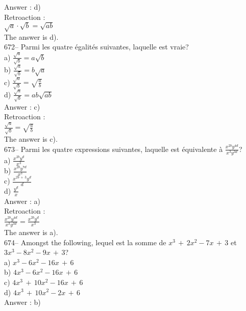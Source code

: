 ﻿\documentclass[letterpaper, 12pt]{article}
\begin{document}
Answer : d)\\

Retroaction : \\
$\sqrt{a}\cdot\sqrt{b}=\sqrt{ab}$\\
The answer is d).\\

672-- Parmi les quatre \'egalit\'es suivantes, laquelle est vraie?\\
a) $\frac{\sqrt{a}}{\sqrt{b}}=a\sqrt{b}$\\[2mm]
b) $\frac{\sqrt{a}}{\sqrt{b}}=b\sqrt{a}$\\[2mm]
c) $\frac{\sqrt{a}}{\sqrt{b}}=\sqrt{\frac{a}{b}}$\\[2mm]
d) $\frac{\sqrt{a}}{\sqrt{b}}=ab\sqrt{ab}$\\

Answer : c)\\

Retroaction : \\[2mm]
$\frac{\sqrt{a}}{\sqrt{b}}=\sqrt{\frac{a}{b}}$\\[2mm]
The answer is c).\\

673-- Parmi les quatre expressions suivantes, laquelle est \'equivalente \`a
$\frac{x^{2b}y^{4d}}{x^{3}y^{3d}}$?\\
a) $\frac{x^{2b}y^{d}}{x^{3}}$\\[2mm]
b) $\frac{x^{2b}y^{7d}}{x^{3}}$\\[2mm]
c) $\frac{x^{2b\,+\,3}y^{d}}{d}$\\[2mm]
d) $\frac{y^{d}}{x}$\\

Answer : a)\\

Retroaction : \\[2mm]
$\frac{x^{2b}y^{4d}}{x^{3}y^{3d}}=\frac{x^{2b}y^{d}}{x^{3}}$\\[2mm]
The answer is a).\\


674-- Amongst the following, lequel est la somme de
$x^{3}\,+\,2x^{2}-7x\,+\,3$ et $3x^{3}-8x^{2}-9x\,+\,3$?\\
a) $x^{3}-6x^{2}-16x\,+\,6$\\
b) $4x^{3}-6x^{2}-16x\,+\,6$\\
c) $4x^{3}\,+\,10x^{2}-16x\,+\,6$\\
d) $4x^{3}\,+\,10x^{2}-2x\,+\,6$\\

Answer : b)\\
\end{document}
